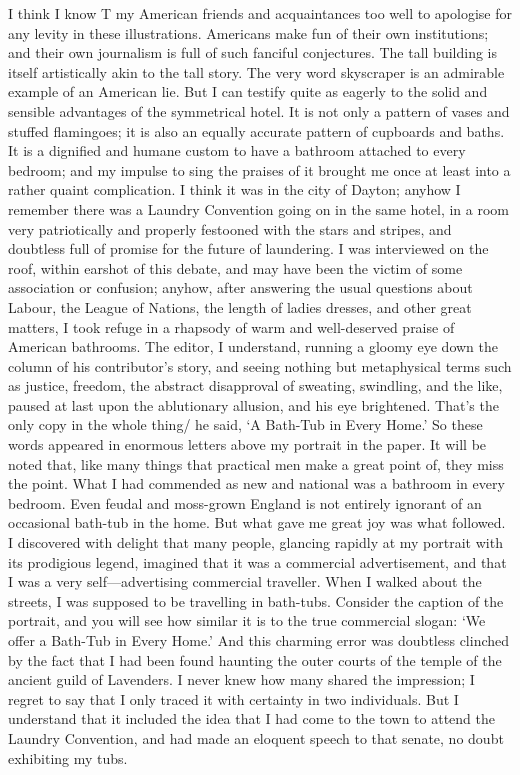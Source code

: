 \documentclass{book}
\begin{document}
I think I know T my American friends and acquaintances too well to apologise for any levity in these illustrations. Americans make fun of their own institutions; and their own journalism is full of such fanciful conjectures. The tall building is itself artistically akin to the tall story. The very word skyscraper is an admirable example of an American lie. But I can testify quite as eagerly to the solid and sensible advantages of the symmetrical hotel. It is not only a pattern of vases and stuffed flamingoes; it is also an equally accurate pattern of cupboards and baths. It is a dignified and humane custom to have a bathroom attached to every bedroom; and my impulse to sing the praises of it brought me once at least into a rather quaint complication. I think it was in the city of Dayton; anyhow I remember there was a Laundry Convention going on in the same hotel, in a room very patriotically and properly festooned with the stars and stripes, and doubtless full of promise for the future of laundering. I was interviewed on the roof, within earshot of this debate, and may have been the victim of some association or confusion; anyhow, after answering the usual questions about Labour, the League of Nations, the length of ladies dresses, and other great matters, I took refuge in a rhapsody of warm and well-deserved praise of American bathrooms. The editor, I understand, running a gloomy eye down the column of his contributor’s story, and seeing nothing but metaphysical terms such as justice, freedom, the abstract disapproval of sweating, swindling, and the like, paused at last upon the ablutionary allusion, and his eye brightened. That’s the only copy in the whole thing/ he said, ‘A Bath-Tub in Every Home.’ So these words appeared in enormous letters above my portrait in the paper. It will be noted that, like many things that practical men make a great point of, they miss the point. What I had commended as new and national was a bathroom in every bedroom. Even feudal and moss-grown England is not entirely ignorant of an occasional bath-tub in the home. But what gave me great joy was what followed. I discovered with delight that many people, glancing rapidly at my portrait with its prodigious legend, imagined that it was a commercial advertisement, and that I was a very self—advertising commercial traveller. When I walked about the streets, I was supposed to be travelling in bath-tubs. Consider the caption of the portrait, and you will see how similar it is to the true commercial slogan: ‘We offer a Bath-Tub in Every Home.’ And this charming error was doubtless clinched by the fact that I had been found haunting the outer courts of the temple of the ancient guild of Lavenders. I never knew how many shared the impression; I regret to say that I only traced it with certainty in two individuals. But I understand that it included the idea that I had come to the town to attend the Laundry Convention, and had made an eloquent speech to that senate, no doubt exhibiting my tubs.
\end{document}
